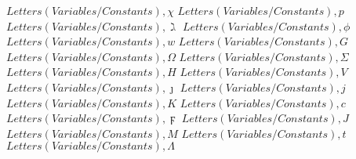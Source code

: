 \documentclass{article}
\begin{document}
$Letters (Variables/Constants),\chi$
\linebreak
\linebreak
$Letters (Variables/Constants),p$
\linebreak
\linebreak
$Letters (Variables/Constants),\gimel$
\linebreak
\linebreak
$Letters (Variables/Constants),\phi$
\linebreak
\linebreak
$Letters (Variables/Constants),w$
\linebreak
\linebreak
$Letters (Variables/Constants),G$
\linebreak
\linebreak
$Letters (Variables/Constants),\Omega$
\linebreak
\linebreak
$Letters (Variables/Constants),\varSigma$
\linebreak
\linebreak
$Letters (Variables/Constants),H$
\linebreak
\linebreak
$Letters (Variables/Constants),V$
\linebreak
\linebreak
$Letters (Variables/Constants),\jmath$
\linebreak
\linebreak
$Letters (Variables/Constants),j$
\linebreak
\linebreak
$Letters (Variables/Constants),K$
\linebreak
\linebreak
$Letters (Variables/Constants),c$
\linebreak
\linebreak
$Letters (Variables/Constants),\digamma$
\linebreak
\linebreak
$Letters (Variables/Constants),J$
\linebreak
\linebreak
$Letters (Variables/Constants),M$
\linebreak
\linebreak
$Letters (Variables/Constants),t$
\linebreak
\linebreak
$Letters (Variables/Constants),\Lambda$
\linebreak
\linebreak
\end{document}
